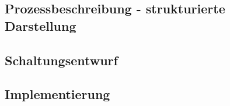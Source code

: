 \subsection{Prozessbeschreibung - strukturierte Darstellung}
\subsection{Schaltungsentwurf}
\subsection{Implementierung}